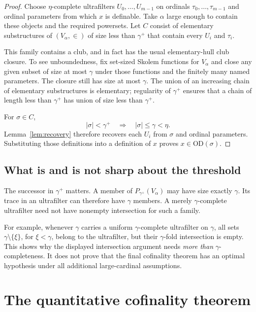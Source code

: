 \documentclass[11pt,letterpaper]{article}
\theoremstyle{definition}
\newcommand{\OD}{\mathrm{OD}}
\numberwithin{equation}{section}
\begin{document}
\begin{proof}
Choose $\eta$-complete ultrafilters $U_0,\dots,U_{m-1}$ on ordinals $\tau_0,\dots,\tau_{m-1}$ and ordinal parameters from which $x$ is definable. Take $\alpha$ large enough to contain these objects and the required powersets. Let $C$ consist of elementary substructures of $(V_\alpha,\in)$ of size less than $\gamma^+$ that contain every $U_i$ and $\tau_i$.

This family contains a club, and in fact has the usual elementary-hull club closure. To see unboundedness, fix set-sized Skolem functions for $V_\alpha$ and close any given subset of size at most $\gamma$ under those functions and the finitely many named parameters. The closure still has size at most $\gamma$. The union of an increasing chain of elementary substructures is elementary; regularity of $\gamma^+$ ensures that a chain of length less than $\gamma^+$ has union of size less than $\gamma^+$.

For $\sigma\in C$,
\[
 |\sigma|<\gamma^+\quad\Longrightarrow\quad
 |\sigma|\leq\gamma<\eta.
\]
Lemma~\ref{lem:recovery} therefore recovers each $U_i$ from $\sigma$ and ordinal parameters. Substituting those definitions into a definition of $x$ proves $x\in\OD(\sigma)$.
\end{proof}

\subsection{What is and is not sharp about the threshold}

The successor in $\gamma^+$ matters. A member of $P_{\gamma^+}(V_\alpha)$ may have size exactly $\gamma$. Its trace in an ultrafilter can therefore have $\gamma$ members. A merely $\gamma$-complete ultrafilter need not have nonempty intersection for such a family.

For example, whenever $\gamma$ carries a uniform $\gamma$-complete ultrafilter on $\gamma$, all sets $\gamma\setminus\{\xi\}$, for $\xi<\gamma$, belong to the ultrafilter, but their $\gamma$-fold intersection is empty. This shows why the displayed intersection argument needs \emph{more than} $\gamma$-completeness. It does not prove that the final cofinality theorem has an optimal hypothesis under all additional large-cardinal assumptions.

\section{The quantitative cofinality theorem}\label{sec:barrier}
\end{document}
